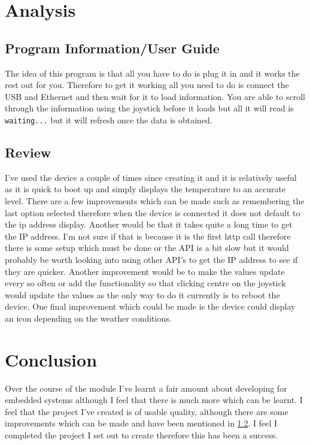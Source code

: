 \documentclass[a4paper,12pt]{scrartcl}
\begin{document}
	\section{Analysis}
	{
		\subsection{Program Information/User Guide}
		{
			The idea of this program is that all you have to do is plug it in and it works the rest out for you. Therefore to get it working all you need to do is connect the USB and Ethernet and then wait for it to load information. You are able to scroll through the information using the joystick before it loads but all it will read is \lstinline|waiting...| but it will refresh once the data is obtained.
		}
		\subsection{Review}\label{sec:Review}
		{
			I've used the device a couple of times since creating it and it is relatively useful as it is quick to boot up and simply displays the temperature to an accurate level. There are a few improvements which can be made such as remembering the last option selected therefore when the device is connected it does not default to the ip address display. Another would be that it takes quite a long time to get the IP address. I'm not sure if that is because it is the first http call therefore there is some setup which must be done or the API is a bit slow but it would probably be worth looking into using other API's to get the IP address to see if they are quicker. Another improvement would be to make the values update every so often or add the functionality so that clicking centre on the joystick would update the values as the only way to do it currently is to reboot the device. One final improvement which could be made is the device could display an icon depending on the weather conditions. 
		}
	}
	
	\section{Conclusion}
	{
		Over the course of the module I've learnt a fair amount about developing for embedded systems although I feel that there is much more which can be learnt. I feel that the  project I've created is of usable quality, although there are some improvements which can be made and have been mentioned in \cref{sec:Review}. I feel I completed the project I set out to create therefore this has been a success.
	}
	
	\newpage
	
	\printbibliography[heading=bibintoc,title=References]
\end{document}
